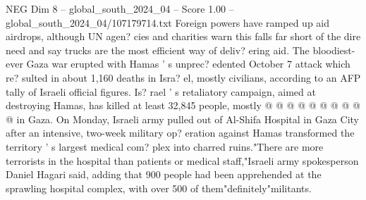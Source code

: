 \begin{textsample}{NEG Dim 8 – global\_south\_2024\_04 – Score 1.00 – global\_south\_2024\_04/107179714.txt}
Foreign powers have ramped up aid airdrops, although UN agen? cies and charities warn this falls far short of the dire need and say trucks are the most efficient way of deliv? ering aid.
The bloodiest-ever Gaza war erupted with Hamas ' s unprec? edented October 7 attack which re? sulted in about 1,160 deaths in Isra? el, mostly civilians, according to an AFP tally of Israeli official figures.
Is? rael ' s retaliatory campaign, aimed at destroying Hamas, has killed at least 32,845 people, mostly @ @ @ @ @ @ @ @ @ @ in Gaza.
On Monday, Israeli army pulled out of Al-Shifa Hospital in Gaza City after an intensive, two-week military op? eration against Hamas transformed the territory ' s largest medical com? plex into charred ruins."There are more terrorists in the hospital than patients or medical staff,"Israeli army spokesperson Daniel Hagari said, adding that 900 people had been apprehended at the sprawling hospital complex, with over 500 of them"definitely"militants.

\end{textsample}
